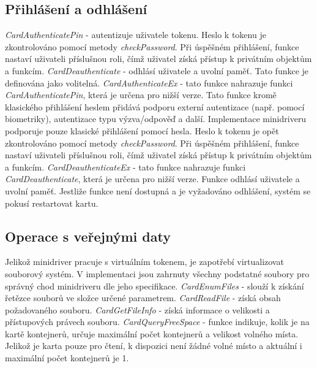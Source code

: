 \documentclass[]{fithesis3}
\begin{document}
		\subsection{Přihlášení a odhlášení}
		\textit{CardAuthenticatePin} - autentizuje uživatele tokenu. Heslo k tokenu je 					zkontrolováno pomocí metody \textit{checkPassword}. Při úspěšném přihlášení, funkce 			nastaví uživateli příslušnou roli, čímž uživatel získá přístup k privátním objektům a funkcím.
		\newline
 		\newline
		\textit{CardDeauthenticate} - odhlásí uživatele a uvolní paměť. Tato funkce je definována 			jako volitelná.
		\newline
		\newline
		\textit{CardAuthenticateEx} - tato funkce nahrazuje funkci \textit{CardAuthenticatePin}, 			která je určena pro nižší verze. Tato funkce kromě klasického přihlášení heslem přidává 			podporu externí autentizace (např. pomocí biometriky), autentizace typu výzva/odpověď a 			další. Implementace minidriveru podporuje pouze klasické přihlášení pomocí hesla. Heslo k 			tokenu je opět zkontrolováno pomocí metody \textit{checkPassword}. Při úspěšném 				přihlášení, funkce nastaví uživateli příslušnou roli, čímž uživatel získá přístup k privátním 			objektům a funkcím.
		\newline
 		\newline
		\textit{CardDeauthenticateEx} - tato funkce nahrazuje funkci \textit{CardDeauthenticate}, 		která je určena pro nižší verze. Funkce odhlásí uživatele a uvolní paměť. Jestliže funkce není 				dostupná a je vyžadováno odhlášení, systém se pokusí restartovat kartu.
		
		\subsection{Operace s veřejnými daty}
		Jelikož minidriver pracuje s virtuálním tokenem, je zapotřebí virtualizovat souborový 				systém. V implementaci jsou zahrnuty všechny podstatné soubory pro správný chod 				minidriveru dle jeho specifikace.
		\newline
		\newline
		\textit{CardEnumFiles} - slouží k získání řetězce souborů ve složce určené parametrem.
		\newline
 		\newline
		\textit{CardReadFile} - získá obsah požadovaného souboru.
		\newline
		\newline
		\textit{CardGetFileInfo} - získá informace o velikosti a přístupových právech souboru.
		\newline
 		\newline
		\textit{CardQueryFreeSpace} - funkce indikuje, kolik je na kartě kontejnerů, určuje 				maximální počet kontejnerů a velikost volného místa. Jelikož je karta pouze pro čtení, k 			dispozici není žádné volné místo a aktuální i\,maximální počet kontejnerů je 1.
\end{document}
